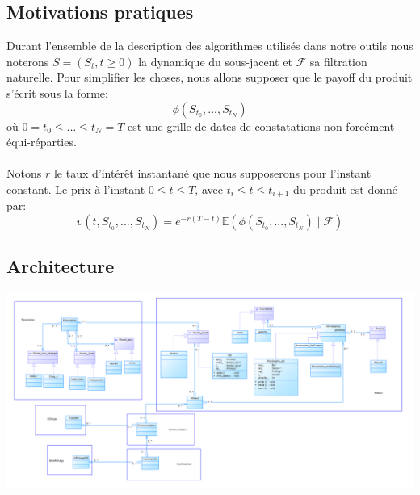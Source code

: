 \documentclass[french,12pt,a4paper]{article}
\begin{document}
\subsection{Motivations pratiques}
Durant l'ensemble de la description  des algorithmes utilisés dans notre outils nous noterons $S = (S_{t}, t \geq 0)$ la dynamique du sous-jacent et $\mathcal{F}$ sa filtration naturelle. Pour simplifier les choses, nous allons supposer que le payoff du produit s'écrit sous la forme:
$$\phi(S_{t_{0}},...,S_{t_{N}}) $$
où $0 = t_{0} \leq ... \leq t_{N} = T$ est une grille de dates de constatations non-forcément équi-réparties.\\\\
Notons $r$ le taux d'intérêt instantané que nous supposerons pour l'instant constant. Le prix à l'instant $0 \leq t \leq T$, avec $t_{i} \leq t \leq t_{i+1}$ du produit est donné par:
$$\upsilon(t, S_{t_{0}},...,S_{t_{N}}) = e^{-r(T-t)}\mathbb{E}(\phi(S_{t_{0}},...,S_{t_{N}})\mid\mathcal{F})$$

\subsection{Architecture}

\begin{center}
\includegraphics[scale=0.3]{Img/Architecture.png}
\end{center}
\end{document}
